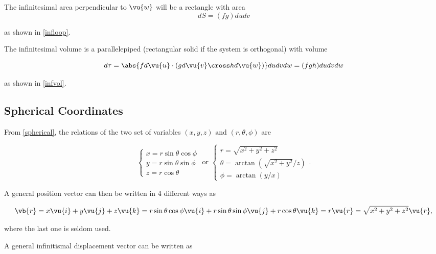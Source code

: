 \documentclass[english,a4paper,12pt]{report}
\begin{document}
The infinitesimal area perpendicular to \(\vu{w}\) will be a rectangle with area
\begin{equation}
	dS = (fg)dudv \label{da}
\end{equation} 

as shown in \cref{infloop}.

	
The infinitesimal volume is a parallelepiped (rectangular solid if the system is orthogonal) with volume

\begin{equation}
    d \tau = \abs{fd \vu{u} \cdot (gd \vu{v} \cross hd \vu{w} )}dudvdw = (fgh)dudvdw 
\end{equation}

as shown in \cref{infvol}. 

	
\subsection{Spherical Coordinates}


From \cref{spherical}, the relations of the two set of variables \((x,y,z) \text { and } (r,\theta ,\phi  )\)  are

\begin{equation}
    \begin{cases} x = r\sin \theta \cos \phi \\ y = r\sin \theta \sin \phi \\ z = r\cos \theta \end{cases} \text { or } \begin{cases} r = \sqrt{x^2+y^2+z^2} \\  \theta = \arctan {\left(\sqrt{x^2+y^2}/z   \right)} \\  \phi = \arctan {\left(y /x\right)} \end{cases}. 
\end{equation}

A general position vector can then be written in 4 different ways as 

\begin{equation}
    \vb{r} = x \vu{i} + y \vu{j} + z \vu{k} = r\sin \theta \cos \phi \vu{i} + r\sin \theta \sin \phi \vu{j} + r \cos \theta \vu{k} = r \vu{r} = \sqrt{x^2+y^2+z^2}\vu{r}, 
\end{equation}

where the last one is seldom used.

A general infinitismal displacement vector can be written as 
\end{document}
